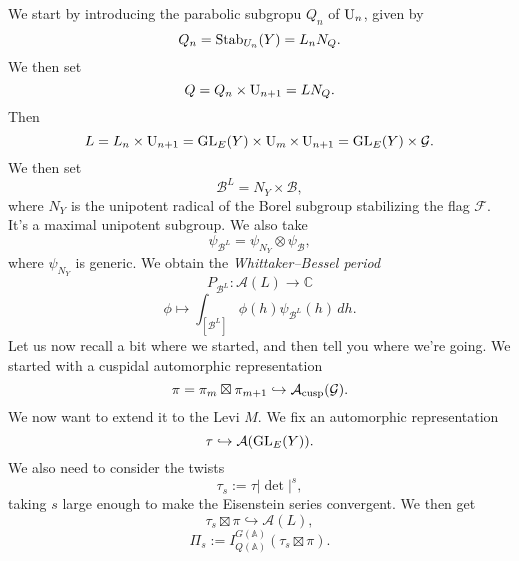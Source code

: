 \documentclass[reqno]{amsart} 
\begin{document}
We start by introducing the parabolic subgropu $Q_n$ of $\operatorname{U}_n$, given by
\begin{equation*}
  Q_n = \operatorname{Stab}_{U_n } (Y) = L_n N_Q.
\end{equation*}
We then set
\begin{equation*}
Q = Q_n \times \operatorname{U}_{n + 1} = L N_Q. 
\end{equation*}
Then
\begin{equation*}
  L = L_n \times \operatorname{U}_{n + 1} = \operatorname{GL}_E (Y) \times \operatorname{U}_m
  \times \operatorname{U}_{n + 1} = \operatorname{GL}_E (Y) \times \mathcal{G}.
\end{equation*}
We then set
\begin{equation*}
\mathcal{B}^L = N_Y \times \mathcal{B},
\end{equation*}
where $N_Y$ is the unipotent radical of the Borel subgroup stabilizing the flag $\mathcal{F}$.  It's a maximal unipotent subgroup.  We also take
\begin{equation*}
\psi_{\mathcal{B}^L } = \psi_{N_Y} \otimes \psi_{\mathcal{B}},
\end{equation*}
where $\psi_{N_Y}$ is generic.  We obtain the \emph{Whittaker--Bessel period}
\begin{equation*}
P_{\mathcal{B}^L } : \mathcal{A} (L) \rightarrow \mathbb{C} 
\end{equation*}
\begin{equation*}
\phi \mapsto \int_{[\mathcal{B}^L ] } \phi (h) \psi_{\mathcal{B}^L } (h) \, d h.
\end{equation*}
Let us now recall a bit where we started, and then tell you where we're going.  We started with a cuspidal automorphic representation
\begin{equation*}
\pi = \pi_m \boxtimes \pi_{m + 1} \hookrightarrow \mathcal{A}_{\operatorname{cusp}} (\mathcal{G}).
\end{equation*}
We now want to extend it to the Levi $M$.  We fix an automorphic representation
\begin{equation*}
\tau \hookrightarrow \mathcal{A} (\operatorname{GL}_E (Y)).
\end{equation*}
We also need to consider the twists
\begin{equation*}
  \tau_s := \tau \lvert \det \rvert^s,
\end{equation*}
taking $s$ large enough to make the Eisenstein series convergent.  We then get
\begin{equation*}
\tau_s \boxtimes \pi \hookrightarrow \mathcal{A} (L),
\end{equation*}
\begin{equation*}
\Pi_s := I_{Q (\mathbb{A})}^{G(\mathbb{A})} (\tau_s \boxtimes \pi ).
\end{equation*}
\end{document}
